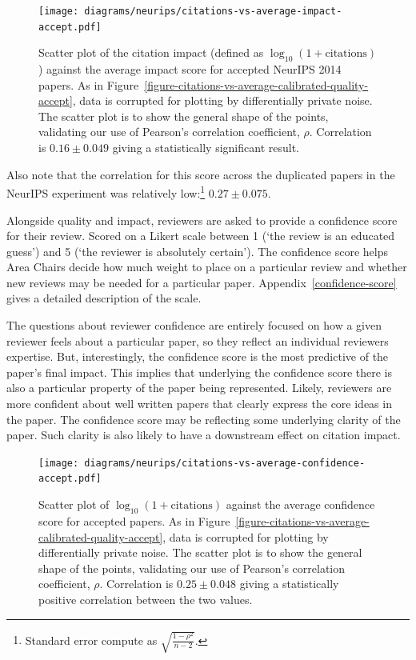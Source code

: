 \documentclass[twoside]{article}
\begin{document}
\begin{figure}[htb]
  \begin{center}
    \texttt{[image: diagrams/neurips/citations-vs-average-impact-accept.pdf]}
  \end{center}
  \caption{Scatter plot of the citation impact (defined as
    $\log_{10}(1+\text{citations})$) against the average impact score
    for accepted NeurIPS 2014 papers. As in Figure~\ref{figure-citations-vs-average-calibrated-quality-accept}, data
    is corrupted for plotting by differentially private noise. The
    scatter plot is to show the general shape of the points,
    validating our use of Pearson's correlation coefficient,
    $\rho$. Correlation is $0.16 \pm 0.049$ giving a statistically
    significant result.}
  \label{figure-citations-vs-average-impact-accept}
\end{figure}

Also note that the correlation for this score across the duplicated
papers in the NeurIPS experiment was relatively low:\footnote{Standard
  error compute as $\sqrt{\frac{1-\rho^2}{n-2}}$.} $0.27 \pm 0.075$.

Alongside quality and impact, reviewers are asked to provide a
confidence score for their review. Scored on a Likert scale between 1
(`the review is an educated guess') and 5 (`the reviewer is absolutely
certain'). The confidence score helps Area Chairs decide how much
weight to place on a particular review and whether new reviews may be
needed for a particular paper. Appendix~\ref{confidence-score} gives a
detailed description of the scale.

The questions about reviewer confidence are entirely focused on how a
given reviewer feels about a particular paper, so they reflect an
individual reviewers expertise. But, interestingly, the confidence
score is the most predictive of the paper's final impact. This implies
that underlying the confidence score there is also a particular
property of the paper being represented. Likely, reviewers are more
confident about well written papers that clearly express the core
ideas in the paper. The confidence score may be reflecting some
underlying clarity of the paper. Such clarity is also likely to have a
downstream effect on citation impact.

\begin{figure}[htb]
\centering
\texttt{[image: diagrams/neurips/citations-vs-average-confidence-accept.pdf]}

\caption{Scatter plot of $\log_{10}(1+\text{citations})$ against the
  average confidence score for accepted papers. As in Figure~\ref{figure-citations-vs-average-calibrated-quality-accept}, data is
  corrupted for plotting by differentially private noise. The scatter
  plot is to show the general shape of the points, validating our use
  of Pearson's correlation coefficient, $\rho$. Correlation is $0.25
  \pm 0.048$ giving a statistically positive correlation between the
  two values.}
\label{figure-citations-vs-average-confidence-accept}
\end{figure}
\end{document}
